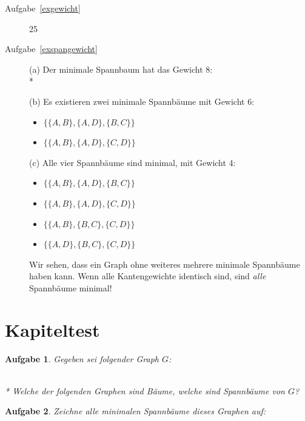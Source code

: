 \documentclass[12pt,a4paper]{report}
\theoremstyle{break}
\newtheorem{exercise}{Aufgabe}[chapter]
\theoremstyle{plain}
\begin{document}
\begin{description}
\item[Aufgabe~\ref{exgewicht}] 25
\item[Aufgabe~\ref{exspangewicht}] 
(a) Der minimale Spannbaum hat das
  Gewicht 8:\\*

(b) Es existieren zwei minimale Spannb\"{a}ume mit Gewicht 6:
\begin{itemize}
\item $\{\{A,B\}, \{A,D\}, \{B,C\}\}$
\item $\{\{A,B\}, \{A,D\}, \{C,D\}\}$
\end{itemize}

(c) Alle vier Spannb\"{a}ume sind minimal, mit Gewicht 4:
\begin{itemize}
\item $\{\{A,B\}, \{A,D\}, \{B,C\}\}$
\item $\{\{A,B\}, \{A,D\}, \{C,D\}\}$
\item $\{\{A,B\}, \{B,C\}, \{C,D\}\}$
\item $\{\{A,D\}, \{B,C\}, \{C,D\}\}$
\end{itemize}

Wir sehen, dass ein Graph ohne weiteres mehrere minimale
Spannb\"{a}ume haben kann. Wenn alle Kantengewichte identisch 
sind, sind \emph{alle} Spannb\"{a}ume minimal!
\end{description}

\newpage
\section{Kapiteltest}
\begin{exercise}\label{kapspan}
Gegeben sei folgender Graph $G$:

\\*
Welche der folgenden Graphen sind B\"{a}ume, welche sind Spannb\"{a}ume von $G$?

\begin{figure}[h!]
\setcounter{subfigure}{0}
\begin{subfigure}[b]{0.3\textwidth}
\caption{}
\end{subfigure}
\begin{subfigure}[b]{0.3\textwidth}
\caption{}
\end{subfigure}
\begin{subfigure}[b]{0.3\textwidth}
\caption{}
\end{subfigure}
\end{figure}
\end{exercise}
\begin{exercise}\label{kapspanmin}
Zeichne alle minimalen Spannb\"{a}ume dieses Graphen auf:

\end{exercise}
\end{document}

